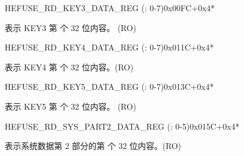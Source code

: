 \begin{register}{H}{EFUSE\_RD\_KEY3\_DATA\_REG (: 0-7)}{0x00FC+0x4*}\label{regdesc:EFUSERDKEY3DATANREG}
%
\regnewline%
\begin{regdesc}\begin{reglist}
\label{fielddesc:EFUSEKEY3DATAN}\item [EFUSE\_KEY3\_DATA\regindex{n}] 表示 KEY3 第  个 32 位内容。 (RO)
\end{reglist}\end{regdesc}
\end{register}


\begin{register}{H}{EFUSE\_RD\_KEY4\_DATA\_REG (: 0-7)}{0x011C+0x4*}\label{regdesc:EFUSERDKEY4DATANREG}
%
\regnewline%
\begin{regdesc}\begin{reglist}
\label{fielddesc:EFUSEKEY4DATAN}\item [EFUSE\_KEY4\_DATA\regindex{n}] 表示 KEY4 第  个 32 位内容。(RO)
\end{reglist}\end{regdesc}
\end{register}


\begin{register}{H}{EFUSE\_RD\_KEY5\_DATA\_REG (: 0-7)}{0x013C+0x4*}\label{regdesc:EFUSERDKEY5DATANREG}
%
\regnewline%
\begin{regdesc}\begin{reglist}
\label{fielddesc:EFUSEKEY5DATAN}\item [EFUSE\_KEY5\_DATA\regindex{n}] 表示 KEY5 第  个 32 位内容。 (RO)
\end{reglist}\end{regdesc}
\end{register}


\begin{register}{H}{EFUSE\_RD\_SYS\_PART2\_DATA\_REG (: 0-5)}{0x015C+0x4*}\label{regdesc:EFUSERDSYSPART2DATANREG}
%
\regnewline%
\begin{regdesc}\begin{reglist}
\label{fielddesc:EFUSESYSDATAPART2N}\item [EFUSE\_SYS\_DATA\_PART2\_\regindex{n}] 表示系统数据第 2 部分的第  个 32 位内容。(RO)
\end{reglist}\end{regdesc}
\end{register}


